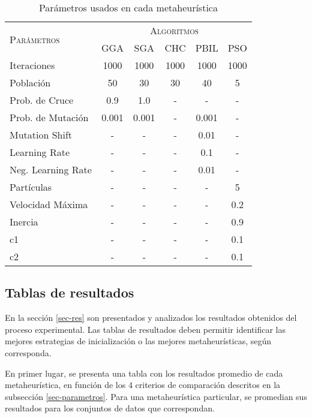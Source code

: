 \begin{table}[h!]
\centering
\begin{tabular}{l c c c c c}
\hline
\multirow{2}{*}{\textsc{Parámetros}}
	& \multicolumn{5}{c}{\textsc{Algoritmos}} \\\cline{2-6}
	& GGA & SGA & CHC & PBIL & PSO \\
\hline
\hline
Iteraciones        &  1000 &  1000 &  1000 &  1000 &  1000 \\
Población          &    50 &    30 &    30 &    40 &     5 \\
Prob. de Cruce     &   0.9 &   1.0 &     - &     - &     - \\
Prob. de Mutación  & 0.001 & 0.001 &     - & 0.001 &     - \\
Mutation Shift     &     - &     - &     - &  0.01 &     - \\
Learning Rate      &     - &     - &     - &   0.1 &     - \\
Neg. Learning Rate &     - &     - &     - &  0.01 &     - \\
Partículas         &     - &     - &     - &     - &     5 \\
Velocidad Máxima   &     - &     - &     - &     - &   0.2 \\
Inercia            &     - &     - &     - &     - &   0.9 \\
c1                 &     - &     - &     - &     - &   0.1 \\
c2                 &     - &     - &     - &     - &   0.1 \\
\hline
\end{tabular}
\caption{Parámetros usados en cada metaheurística}
\label{table-parameters}
\end{table}

\subsection{Tablas de resultados}

En la sección \ref{sec-res} son presentados y analizados los resultados obtenidos del proceso experimental. Las tablas de resultados deben permitir identificar las mejores estrategias de inicialización o las mejores metaheurísticas, según corresponda.

En primer lugar, se presenta una tabla con los resultados promedio de cada metaheurística, en función de los 4 criterios de comparación descritos en la subsección \ref{sec-parametros}. Para una metaheurística particular, se promedian sus resultados para los conjuntos de datos que correspondan.

